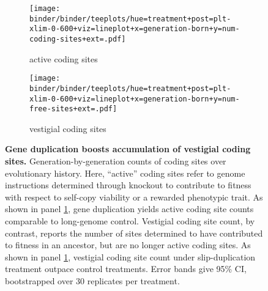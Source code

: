 \begin{figure}
    \centering
    \begin{subfigure}{\linewidth}
    \texttt{[image: binder/binder/teeplots/hue=treatment+post=plt-xlim-0-600+viz=lineplot+x=generation-born+y=num-coding-sites+ext=.pdf]}
    \caption{\footnotesize active coding sites}
    \label{fig:num-coding-sites:active}
    \end{subfigure}

    \begin{subfigure}{\linewidth}
\texttt{[image: binder/binder/teeplots/hue=treatment+post=plt-xlim-0-600+viz=lineplot+x=generation-born+y=num-free-sites+ext=.pdf]}
    \caption{\footnotesize vestigial coding sites}
    \label{fig:num-coding-sites:vestigial}
    \end{subfigure}
    \caption{
        \textbf{Gene duplication boosts accumulation of vestigial coding sites.}
        \footnotesize
        Generation-by-generation counts of coding sites over evolutionary history.
        Here, ``active'' coding sites refer to genome instructions determined through knockout to contribute to fitness with respect to self-copy viability or a rewarded phenotypic trait.
        As shown in panel \ref{fig:num-coding-sites:active}, gene duplication yields active coding site counts comparable to long-genome control.
        Vestigial coding site count, by contrast, reports the number of sites determined to have contributed to fitness in an ancestor, but are no longer active coding sites.
        As shown in panel \ref{fig:num-coding-sites:active}, vestigial coding site count under slip-duplication treatment outpace control treatments.
        Error bands give 95\% CI, bootstrapped over 30 replicates per treatment.
    }
    \label{fig:num-coding-sites}
\end{figure}
